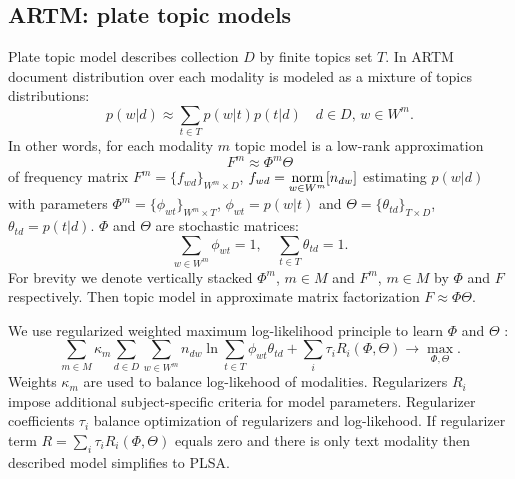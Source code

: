 \documentclass[12pt, twoside]{article}
\begin{document}
\subsection{ARTM: plate topic models}
Plate topic model describes collection $D$ by finite topics set $T$. In ARTM~\cite{ARTM} document distribution over each modality is modeled as a mixture of topics distributions:
\[
p(w|d) \approx \sum_{t \in T} p(w|t) p(t|d)   \quad  d \in D, \, w \in W^m.
\]
In other words, for each modality $m$ topic model is a low-rank approximation 
\[
F^m\approx \Phi^m \Theta
\]
of frequency matrix $F^m = \{f_{wd}\}_{W^m \times D}$, $f_{wd} = \mathop{\text{norm}}\limits_{w \in W^m} [n_{dw}]$ estimating $p(w|d)$ with parameters $\Phi^m = \{\phi_{wt}\}_{W^m \times T}$, $\phi_{wt} = p(w|t)$ and $\Theta = \{\theta_{td}\}_{T \times D}$, $\theta_{td} = p(t|d)$. $\Phi$ and $\Theta$ are stochastic matrices:
\begin{equation}
	\label{constrains}
\sum_{w \in W^m} \phi_{wt} = 1, \quad \sum_{t \in T} \theta_{td} = 1.
\end{equation}
For brevity we denote vertically stacked $\Phi^m$, $m \in M$ and $F^m$, $m \in M$ by $\Phi$ and $F$ respectively. Then topic model in approximate matrix factorization $F \approx \Phi \Theta$.

We use regularized weighted maximum log-likelihood principle to learn $\Phi$ and $\Theta$ :
\begin{equation}
\label{optimization_problem}
    \sum_{m \in M} \kappa_m \sum_{d \in D} \sum_{w \in W^m} n_{dw} \ln \sum_{t \in T} \phi_{wt} \theta_{td} + \sum_i \tau_i R_i(\Phi, \Theta) \rightarrow \max_{\Phi, \Theta}.
\end{equation}
Weights $\kappa_m$ are used to balance log-likehood of modalities. Regularizers $R_i$ impose additional subject-specific criteria for model parameters. Regularizer coefficients $\tau_i$ balance optimization of regularizers and log-likehood. If regularizer term $R = \sum_i \tau_i R_i(\Phi, \Theta)$ equals zero and there is only text modality then described model simplifies to PLSA.
\end{document}
